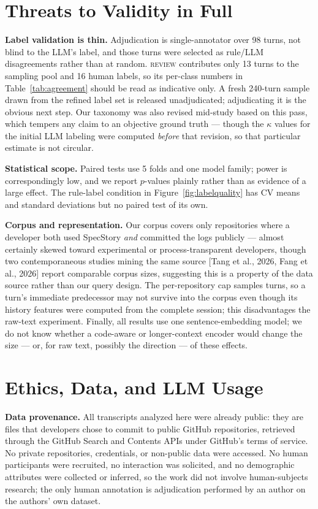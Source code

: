 \documentclass{article}
\begin{document}
\section{Threats to Validity in Full}
\label{app:threats}

\textbf{Label validation is thin.} Adjudication is single-annotator over 98
turns, not blind to the LLM's label, and those turns were selected as rule/LLM
disagreements rather than at random. \textsc{review} contributes only 13 turns
to the sampling pool and 16 human labels, so its per-class numbers in
Table~\ref{tab:agreement} should be read as indicative only. A fresh 240-turn
sample drawn from the refined label set is released unadjudicated; adjudicating
it is the obvious next step. Our taxonomy was also revised mid-study based on
this pass, which tempers any claim to an objective ground truth --- though the
$\kappa$ values for the initial LLM labeling were computed \emph{before} that
revision, so that particular estimate is not circular.

\textbf{Statistical scope.} Paired tests use 5 folds and one model family; power
is correspondingly low, and we report $p$-values plainly rather than as evidence
of a large effect. The rule-label condition in Figure~\ref{fig:labelquality} has
CV means and standard deviations but no paired test of its own.

\textbf{Corpus and representation.} Our corpus covers only repositories where a
developer both used SpecStory \emph{and} committed the logs publicly --- almost
certainly skewed toward experimental or process-transparent developers, though
two contemporaneous studies mining the same source [Tang et al., 2026, Fang et
al., 2026] report comparable corpus sizes, suggesting this is a property of the
data source rather than our query design. The per-repository cap samples turns,
so a turn's immediate predecessor may not survive into the corpus even though
its history features were computed from the complete session; this disadvantages
the raw-text experiment. Finally, all results use one sentence-embedding model;
we do not know whether a code-aware or longer-context encoder would change the
size --- or, for raw text, possibly the direction --- of these effects.

\section{Ethics, Data, and LLM Usage}
\label{app:ethics}

\textbf{Data provenance.} All transcripts analyzed here were already public:
they are files that developers chose to commit to public GitHub repositories,
retrieved through the GitHub Search and Contents APIs under GitHub's terms of
service. No private repositories, credentials, or non-public data were accessed.
No human participants were recruited, no interaction was solicited, and no
demographic attributes were collected or inferred, so the work did not involve
human-subjects research; the only human annotation is adjudication performed by
an author on the authors' own dataset.
\end{document}
